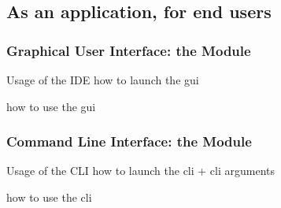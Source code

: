 \documentclass[handout]{beamer}
\begin{document}
\subsection{As an application, for end users}

\subsubsection{Graphical User Interface: the  Module}

\begin{frame}[allowframebreaks]{Usage of the IDE}
    how to launch the gui

    how to use the gui
\end{frame}

\subsubsection{Command Line Interface: the  Module}

\begin{frame}[allowframebreaks]{Usage of the CLI}
    how to launch the cli
        + cli arguments

    how to use the cli
\end{frame}

\section*{}
\frame{\titlepage}

\section*{\bibname}


\begin{frame}\frametitle{\refname}
    \footnotesize
    
    
\end{frame}

\end{document}
